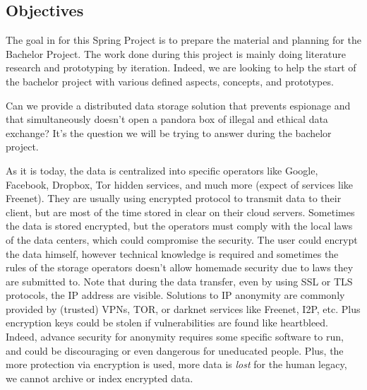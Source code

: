 
\subsection{Objectives}
The goal in for this Spring Project is to prepare the material and planning for the Bachelor Project. The work done during this project is mainly doing literature research and prototyping by iteration. Indeed, we are looking to help the start of the bachelor project with various defined aspects, concepts, and prototypes.

Can we provide a distributed data storage solution that prevents espionage and that simultaneously doesn't open a pandora box of illegal and ethical data exchange? It's the question we will be trying to answer during the bachelor project.

As it is today, the data is centralized into specific operators like Google, Facebook, Dropbox, Tor hidden services, and much more (expect of services like Freenet\cite{Clarke2001Freenet:System}). They are usually using encrypted protocol to transmit data to their client, but are most of the time stored in clear on their cloud servers. Sometimes the data is stored encrypted, but the operators must comply with the local laws of the data centers, which could compromise the security. The user could encrypt the data himself, however technical knowledge is required and sometimes the rules of the storage operators doesn't allow homemade security due to laws they are submitted to. Note that during the data transfer, even by using SSL or TLS protocols, the IP address are visible. Solutions to IP anonymity are commonly provided by (trusted) VPNs, TOR\cite{Dingledine2004Tor:Router}, or darknet\cite{Delmer2009LemergenceI2p} services like Freenet, I2P\cite{Delmer2009LemergenceI2p}, etc. Plus encryption keys could be stolen if vulnerabilities are found like heartbleed\cite{Mehta2014TheBug}. Indeed, advance security for anonymity requires some specific software to run, and could be discouraging or even dangerous for uneducated people. Plus, the more protection via encryption is used, more data is \textit{lost} for the human legacy, we cannot archive or index encrypted data.

